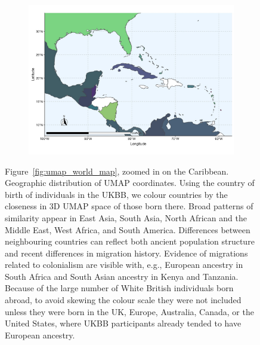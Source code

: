 \documentclass[12pt]{pnas-new}
\begin{document}
\begin{figure}
    \centering
    \begin{subfigure}{\textwidth}
    \includegraphics[width=\textwidth]{images/meanCarribeanMap.jpg}
    \end{subfigure}
    \caption{Figure~\ref{fig:umap_world_map}, zoomed in on the Caribbean. Geographic distribution of UMAP coordinates. Using the country of birth of individuals in the UKBB, we colour countries by the closeness in 3D UMAP space of those born there. Broad patterns of similarity appear in East Asia, South Asia, North African and the Middle East, West Africa, and South America. Differences between neighbouring countries can reflect both ancient population structure and recent differences in migration history. Evidence of migrations related to colonialism are visible with, e.g., European ancestry in South Africa and South Asian ancestry in Kenya and Tanzania. Because of the large number of White British individuals born abroad, to avoid skewing the colour scale they were not included unless they were born in the UK, Europe, Australia, Canada, or the United States, where UKBB participants already tended to have European ancestry.}
    \label{fig:supp_umap_ukbb_car}
\end{figure}
\end{document}
